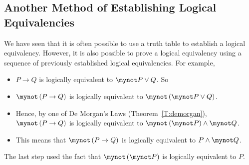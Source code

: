 %
\subsection*{Another Method of Establishing Logical Equivalencies}
We have seen that it is often possible to use a truth table to establish a logical equivalency.   
%
%
%
However, it is also possible to prove a logical equivalency using a sequence of previously established logical equivalencies.  For example,
%
\begin{itemize}
\item $P \to Q$ is logically equivalent to  $\mynot  P \vee Q$.  So
\item $\mynot  \left( {P \to Q} \right)$  is logically equivalent to  $\mynot  \left( {\mynot  P \vee Q} \right)$.   
\item Hence, by one of De Morgan's Laws (Theorem~\ref{T:demorgan}), $\mynot  \left( {P \to Q} \right)$  is logically equivalent to  $\mynot  \left( {\mynot  P} \right) \wedge \mynot  Q$.  
\item This means that $\mynot  \left( {P \to Q} \right)$ is logically equivalent to  $P \wedge \mynot  Q$. 
\end{itemize}
%
The last step used the fact that  $\mynot  \left( {\mynot  P} \right)$ is logically equivalent to  $P$.
\hbreak




